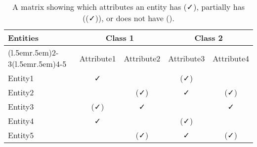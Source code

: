 \begin{table}[tb]
  \newcommand{\checkYes}{\faCheck}%
  \newcommand{\checkPartially}{{\color{gray}(\faCheck)}}
  \newcommand{\checkNo}{\faTimes}
  \caption{A matrix showing which attributes an entity has (\checkYes), partially has (\checkPartially), or does not have (\checkNo).}
  \label{table-with-checkmarks}
  \centering\small
  \begin{tabular}{@{}l@{\hspace{3\tabcolsep}}cccc@{}} %
    \toprule
    \bfseries Entities & \multicolumn{2}{c}{\bfseries Class 1} & \multicolumn{2}{c}{\bfseries Class 2} \\
    \cmidrule(l{.5em}r{.5em}){2-3}\cmidrule(l{.5em}r{.5em}){4-5} 
    & Attribute1 & Attribute2 & Attribute3 & Attribute4 \\
    \midrule
               Entity1 &            \checkYes &             \checkNo &      \checkPartially &             \checkNo \\
               Entity2 &             \checkNo &      \checkPartially &            \checkYes &      \checkPartially \\
               Entity3 &      \checkPartially &            \checkYes &             \checkNo &            \checkYes \\
               Entity4 &            \checkYes &             \checkNo &      \checkPartially &             \checkNo \\
               Entity5 &             \checkNo &      \checkPartially &            \checkYes &      \checkPartially \\
               \bottomrule                          
  \end{tabular}
\end{table}

